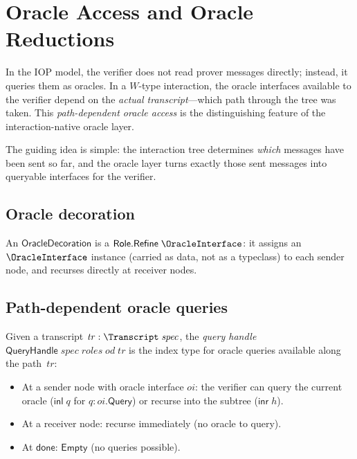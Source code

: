 
\section{Oracle Access and Oracle Reductions}\label{sec:interaction-oracle}

In the IOP model, the verifier does not read prover messages directly; instead,
it queries them as oracles.  In a $W$-type interaction, the oracle interfaces
available to the verifier depend on the \emph{actual transcript}---which path
through the tree was taken.  This \emph{path-dependent oracle access} is the
distinguishing feature of the interaction-native oracle layer.

The guiding idea is simple: the interaction tree determines \emph{which}
messages have been sent so far, and the oracle layer turns exactly those sent
messages into queryable interfaces for the verifier.

\subsection{Oracle decoration}

\begin{definition}[OracleDecoration]
  \label{int:oracle-decoration}
  An $\mathsf{OracleDecoration}$ is a
  $\mathsf{Role.Refine}\;\OracleInterface$: it assigns an
  $\OracleInterface$ instance (carried as data, not as a typeclass) to each
  sender node, and recurses directly at receiver nodes.
\end{definition}

\subsection{Path-dependent oracle queries}

\begin{definition}[QueryHandle]
  \label{int:query-handle}
  Given a transcript $\mathit{tr} : \Transcript\;\mathit{spec}$, the
  \emph{query handle} $\mathsf{QueryHandle}\;\mathit{spec}\;\mathit{roles}\;
  \mathit{od}\;\mathit{tr}$ is the index type for oracle queries available
  along the path~$\mathit{tr}$:
  \begin{itemize}
    \item At a sender node with oracle interface $\mathit{oi}$: the verifier can
      query the current oracle ($\mathsf{inl}\;q$ for $q : \mathit{oi}.\mathsf{Query}$)
      or recurse into the subtree ($\mathsf{inr}\;h$).
    \item At a receiver node: recurse immediately (no oracle to query).
    \item At $\mathsf{done}$: $\mathsf{Empty}$ (no queries possible).
  \end{itemize}
\end{definition}

